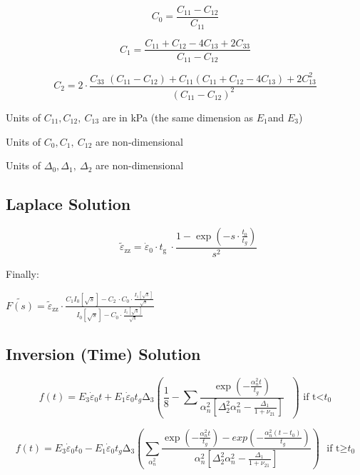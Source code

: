 \documentclass[
]{article}
\begin{document}
\[C_{0} = \frac{C_{11} - C_{12}}{C_{11}}\]

\[C_{1} = \frac{C_{11} + C_{12} - {4C}_{13} + 2C_{33}}{C_{11} - C_{12}}\]

\[C_{2} = 2 \cdot \frac{C_{33\ \ }\left( C_{11} - C_{12} \right) + C_{11}\left( C_{11} + C_{12} - {4C}_{13} \right) + 2C_{13}^{2}}{\left( C_{11} - C_{12} \right)^{2}}\]

Units of \(C_{11},C_{12},\ C_{13}\) are in kPa (the same dimension as
\(E_{1}\)and \(E_{3}\))

Units of \(C_{0},C_{1},\ C_{12}\) are non-dimensional

Units of \(\Delta_{0},\Delta_{1},\ \Delta_{2}\) are non-dimensional

\hypertarget{laplace-solution}{%
\subsection{Laplace Solution}\label{laplace-solution}}

\[\text{\ \ }{\widetilde{\varepsilon}}_{\text{zz}} = {\dot{\varepsilon}}_{0} \cdot t_{\text{g\ }} \cdot \frac{1 - \exp\left( - s \cdot \frac{t_{0}}{t_{g}} \right)}{s^{2}}\]

Finally:

\(\widetilde{F(s)} = {\widetilde{\varepsilon}}_{\text{zz}} \cdot \frac{C_{1}I_{0}\left\lbrack \sqrt{s} \right\rbrack - C_{2\ } \cdot C_{0} \cdot \frac{I_{1}\left\lbrack \sqrt{s} \right\rbrack}{\sqrt{s}}}{I_{0}\left\lbrack \sqrt{s} \right\rbrack - C_{0} \cdot \frac{I_{1}\left\lbrack \sqrt{s} \right\rbrack}{\sqrt{s}}}\)

\hypertarget{inversion-time-solution}{%
\subsection{Inversion (Time) Solution}\label{inversion-time-solution}}

\[f(t) = E_{3}{\dot{\varepsilon}}_{0}t + E_{1}{\dot{\varepsilon}}_{0}t_{g}\mathrm{\Delta}_{3}\left( \frac{1}{8} - \sum_{}^{}\frac{\exp\left( - \frac{\alpha_{n}^{2}t}{t_{g}} \right)}{\alpha_{n}^{2}\left\lbrack \Delta_{2}^{2}\alpha_{n}^{2} - \frac{\Delta_{1\ }}{1 + \nu_{21\ }} \right\rbrack}\text{\ } \right)\text{\ \ if\ t<}t_{0}\]

\[f(t) = E_{3}{\dot{\varepsilon}}_{0}t_{0} - E_{1}{\dot{\varepsilon}}_{0}t_{g}\mathrm{\Delta}_{3}\left( \sum_{\alpha_{n}^{2}}^{}\frac{\exp\left( - \frac{\alpha_{n}^{2}t}{t_{g}} \right) - exp( - \frac{\alpha_{n}^{2}\left( t - t_{0} \right)}{t_{g}})}{\alpha_{n}^{2}\left\lbrack \Delta_{2}^{2}\alpha_{n}^{2} - \frac{\Delta_{1\ }}{1 + \nu_{21\ }} \right\rbrack} \right)\text{\ \ \ }\text{if\ t}\text{≥}t_{0}\]
\end{document}
